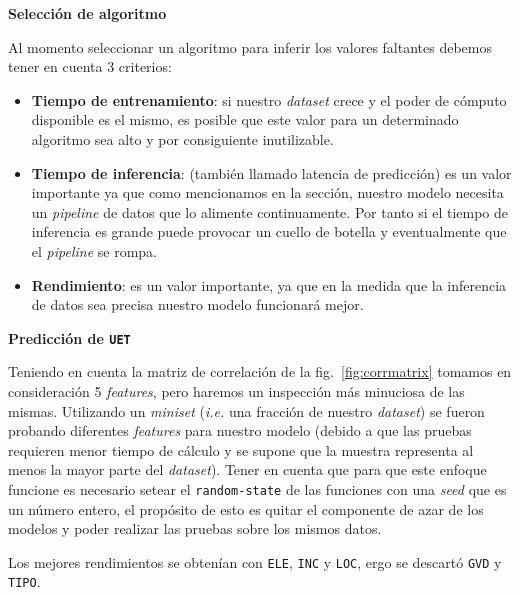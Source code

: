 \documentclass[a4paper,12pt]{article}
\begin{document}
		\hfill
				
		\textbf{Selección de algoritmo}
				
		Al momento seleccionar un algoritmo para inferir los valores faltantes debemos tener en cuenta 3 criterios:
		\begin{itemize}
			\item \textbf{Tiempo de entrenamiento}: si nuestro \textit{dataset} crece y el poder de cómputo disponible es el mismo, es posible que este valor para un determinado algoritmo sea alto y por consiguiente inutilizable.
			\item \textbf{Tiempo de inferencia}: (también llamado latencia de predicción) es un valor importante ya que como mencionamos en la sección, nuestro modelo necesita un \textit{pipeline} de datos que lo alimente continuamente. Por tanto si el tiempo de inferencia es grande puede provocar un cuello de botella y eventualmente que el \textit{pipeline} se rompa.
			\item \textbf{Rendimiento}: es un valor importante, ya que en la medida que la inferencia de datos sea precisa nuestro modelo funcionará mejor.
		\end{itemize}
				
		\textbf{Predicción de \texttt{UET}}
				
		Teniendo en cuenta la matriz de correlación de la fig.~\ref{fig:corrmatrix} tomamos en consideración 5 \textit{features}, pero haremos un inspección más minuciosa de las mismas. Utilizando un \textit{miniset} (\textit{i.e.} una fracción de nuestro \textit{dataset}) se fueron probando diferentes \textit{features} para nuestro modelo (debido a que las pruebas requieren menor tiempo de cálculo y se supone que la muestra representa al menos la mayor parte del \textit{dataset}). Tener en cuenta que para que este enfoque funcione es necesario setear el \texttt{random-state} de las funciones con una \textit{seed} que es un número entero, el propósito de esto es quitar el componente de azar de los modelos y poder realizar las pruebas sobre los mismos datos.
				
		Los mejores rendimientos se obtenían con \texttt{ELE}, \texttt{INC} y \texttt{LOC}, ergo se descartó \texttt{GVD} y \texttt{TIPO}.
				
\end{document}
